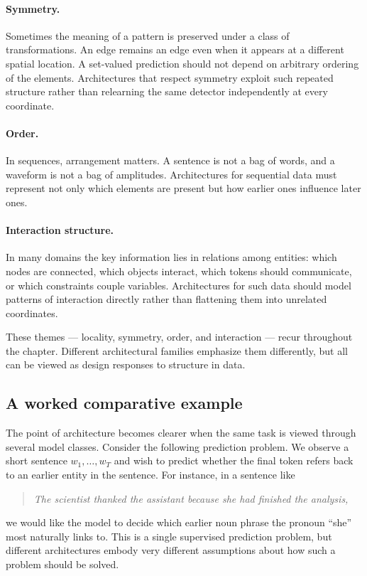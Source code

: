\paragraph{Symmetry.}
Sometimes the meaning of a pattern is preserved under a class of transformations.
An edge remains an edge even when it appears at a different spatial location.
A set-valued prediction should not depend on arbitrary ordering of the elements.
Architectures that respect symmetry exploit such repeated structure rather than relearning the same detector independently at every coordinate.

\paragraph{Order.}
In sequences, arrangement matters.
A sentence is not a bag of words, and a waveform is not a bag of amplitudes.
Architectures for sequential data must represent not only which elements are present but how earlier ones influence later ones.

\paragraph{Interaction structure.}
In many domains the key information lies in relations among entities:
which nodes are connected,
which objects interact,
which tokens should communicate,
or which constraints couple variables.
Architectures for such data should model patterns of interaction directly rather than flattening them into unrelated coordinates.

\medskip

These themes --- locality, symmetry, order, and interaction --- recur throughout the chapter.
Different architectural families emphasize them differently, but all can be viewed as design responses to structure in data.

\subsection*{A worked comparative example}

The point of architecture becomes clearer when the same task is viewed through several model classes.
Consider the following prediction problem.
We observe a short sentence $w_1,\dots,w_T$ and wish to predict whether the final token refers back to an earlier entity in the sentence.
For instance, in a sentence like
\begin{quote}
\emph{The scientist thanked the assistant because she had finished the analysis,}
\end{quote}
we would like the model to decide which earlier noun phrase the pronoun ``she'' most naturally links to.
This is a single supervised prediction problem, but different architectures embody very different assumptions about how such a problem should be solved.


